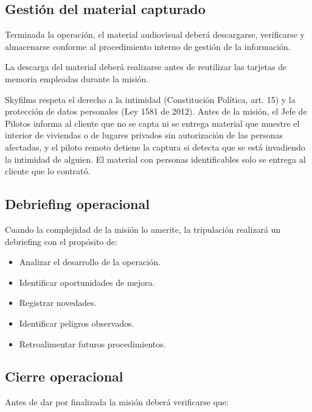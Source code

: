 \subsection{Gestión del material capturado}

Terminada la operación, el material audiovisual deberá descargarse, verificarse y almacenarse conforme al procedimiento interno de gestión de la información.

La descarga del material deberá realizarse antes de reutilizar las tarjetas de memoria empleadas durante la misión.

Skyfilms respeta el derecho a la intimidad (Constitución Política, art. 15) y la protección de datos personales (Ley 1581 de 2012). Antes de la misión, el Jefe de Pilotos informa al cliente que no se capta ni se entrega material que muestre el interior de viviendas o de lugares privados sin autorización de las personas afectadas, y el piloto remoto detiene la captura si detecta que se está invadiendo la intimidad de alguien. El material con personas identificables solo se entrega al cliente que lo contrató.


\subsection{Debriefing operacional}

Cuando la complejidad de la misión lo amerite, la tripulación realizará un debriefing con el propósito de:

\begin{itemize}

\item Analizar el desarrollo de la operación.

\item Identificar oportunidades de mejora.

\item Registrar novedades.

\item Identificar peligros observados.

\item Retroalimentar futuros procedimientos.

\end{itemize}

\subsection{Cierre operacional}

Antes de dar por finalizada la misión deberá verificarse que:

